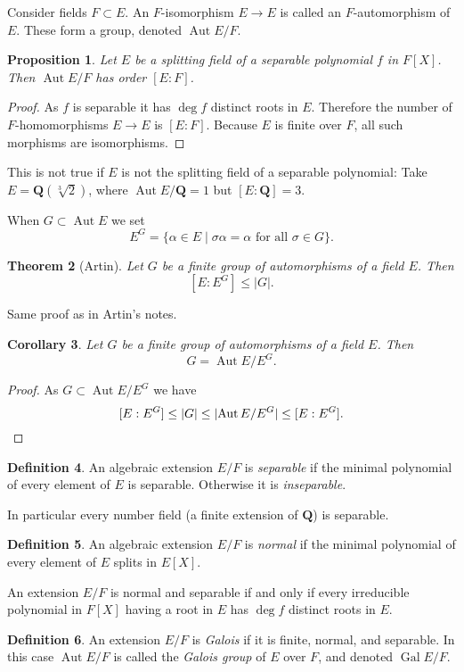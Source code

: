 \documentclass[11pt]{amsart}
\newtheorem{theo}{Theorem}[section]
\newtheorem{prop}[theo]{Proposition}
\newtheorem{coro}[theo]{Corollary}
\theoremstyle{definition}
\newtheorem{defi}[theo]{Definition}
\def\QQ{\mathbf{Q}}
\DeclareMathOperator{\Aut}{Aut}
\DeclareMathOperator{\Gal}{Gal}
\begin{document}
Consider fields $F \subset E$.
An $F$-isomorphism $E \to E$ is called an $F$-automorphism of $E$.
These form a group, denoted $\Aut E/F$.


\begin{prop}
Let $E$ be a splitting field of a separable polynomial $f$ in $F[X]$.
Then $\Aut E/F$ has order $[E:F]$.
\end{prop}

\begin{proof}
As $f$ is separable it has $\deg f$ distinct roots in $E$.
Therefore the number of $F$-homomorphisms $E \to E$ is $[E:F]$.
Because $E$ is finite over $F$, all such morphisms are isomorphisms.
\end{proof}

This is not true if $E$ is not the splitting field of a separable polynomial:
Take $E = \QQ(\sqrt[3]2)$, where $\Aut E/\QQ = 1$ but $[E:\QQ] = 3$.

When $G \subset \Aut E$ we set
\[
E^G = \{ \alpha \in E \mid \sigma \alpha = \alpha \text{ for all $\sigma \in G$}\}.
\]

\begin{theo}[Artin]
Let $G$ be a finite group of automorphisms of a field $E$.
Then
\[
[E : E^G] \leq |G|.
\]
\end{theo}

Same proof as in Artin's notes.

\begin{coro}
Let $G$ be a finite group of automorphisms of a field $E$.
Then
\[
G = \Aut E/E^G.
\]
\end{coro}

\begin{proof}
As $G \subset \Aut E/E^G$ we have
\[
[E:E^G] \leq |G|
\leq |\!\Aut E/E^G|
\leq [E:E^G].
\qedhere
\]
\end{proof}


\begin{defi}
An algebraic extension $E/F$ is \emph{separable} if the minimal polynomial of every element of $E$ is separable.
Otherwise it is \emph{inseparable}.
\end{defi}

In particular every number field (a finite extension of $\QQ$) is separable.


\begin{defi}
An algebraic extension $E/F$ is \emph{normal} if the minimal polynomial of every element of $E$ splits in $E[X]$.
\end{defi}

An extension $E/F$ is normal and separable if and only if every irreducible polynomial in $F[X]$ having a root in $E$ has $\deg f$ distinct roots in $E$.

\begin{defi}
An extension $E/F$ is \emph{Galois} if it is finite, normal, and separable.
In this case $\Aut E/F$ is called the \emph{Galois group} of $E$ over $F$, and denoted $\Gal E/F$.
\end{defi}
\end{document}
